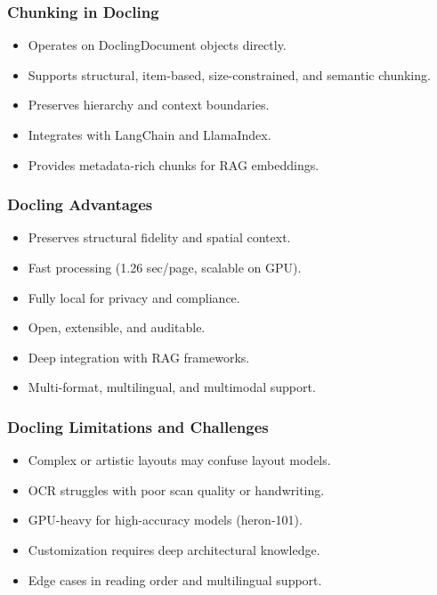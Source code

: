 \begin{frame}[fragile]\frametitle{Chunking in Docling}
      \begin{itemize}
        \item Operates on DoclingDocument objects directly.
        \item Supports structural, item-based, size-constrained, and semantic chunking.
        \item Preserves hierarchy and context boundaries.
        \item Integrates with LangChain and LlamaIndex.
        \item Provides metadata-rich chunks for RAG embeddings.
      \end{itemize}
\end{frame}

\begin{frame}[fragile]\frametitle{Docling Advantages}
      \begin{itemize}
        \item Preserves structural fidelity and spatial context.
        \item Fast processing (1.26 sec/page, scalable on GPU).
        \item Fully local for privacy and compliance.
        \item Open, extensible, and auditable.
        \item Deep integration with RAG frameworks.
        \item Multi-format, multilingual, and multimodal support.
      \end{itemize}
\end{frame}

\begin{frame}[fragile]\frametitle{Docling Limitations and Challenges}
      \begin{itemize}
        \item Complex or artistic layouts may confuse layout models.
        \item OCR struggles with poor scan quality or handwriting.
        \item GPU-heavy for high-accuracy models (heron-101).
        \item Customization requires deep architectural knowledge.
        \item Edge cases in reading order and multilingual support.
      \end{itemize}
\end{frame}

